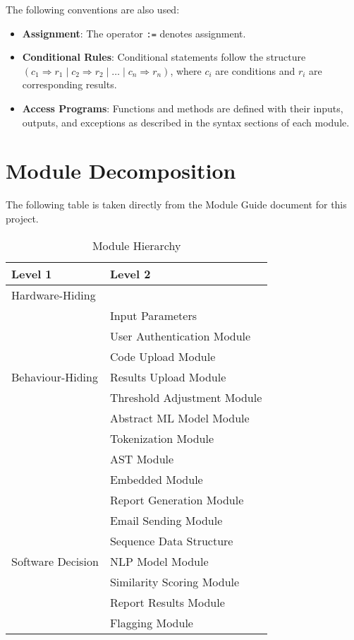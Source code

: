 \documentclass[12pt, titlepage]{article}
\begin{document}
\noindent
The following conventions are also used:
\begin{itemize}
    \item \textbf{Assignment}: The operator \texttt{:=} denotes assignment.
    \item \textbf{Conditional Rules}: Conditional statements follow the structure $(c_1 \Rightarrow r_1 \mid c_2 \Rightarrow r_2 \mid \ldots \mid c_n \Rightarrow r_n)$, where $c_i$ are conditions and $r_i$ are corresponding results.
    \item \textbf{Access Programs}: Functions and methods are defined with their inputs, outputs, and exceptions as described in the syntax sections of each module.
\end{itemize}

\section{Module Decomposition}

The following table is taken directly from the Module Guide document for this project.

\begin{table}[h!]
\centering
\begin{tabular}{p{} p{}}
\toprule
\textbf{Level 1} & \textbf{Level 2}\\
\midrule

{Hardware-Hiding} & ~ \\
\midrule

\multirow{7}{0.3\textwidth}{Behaviour-Hiding} & Input Parameters\\
& User Authentication Module \\
& Code Upload Module \\
& Results Upload Module \\
& Threshold Adjustment Module \\
& Abstract ML Model Module \\
& Tokenization Module \\
& AST Module \\
& Embedded Module \\
& Report Generation Module \\
& Email Sending Module \\
\midrule

\multirow{3}{0.3\textwidth}{Software Decision} & {Sequence Data Structure}\\
& NLP Model Module \\
& Similarity Scoring Module \\
& Report Results Module \\
& Flagging Module \\
\bottomrule

\end{tabular}
\caption{Module Hierarchy}
\label{TblMH}
\end{table}
\end{document}
